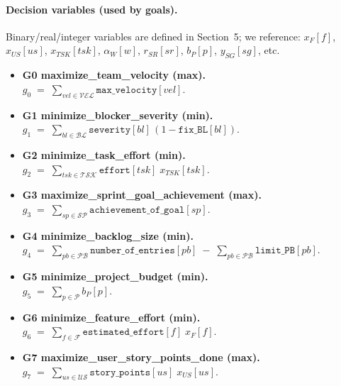 \documentclass[11pt,a4paper]{article}
\begin{document}
\paragraph{Decision variables (used by goals).}
Binary/real/integer variables are defined in Section~5; we reference:
$x_F[f]$, $x_{US}[us]$, $x_{TSK}[tsk]$, $\alpha_W[w]$, $r_{SR}[sr]$, $b_P[p]$, $y_{SG}[sg]$, etc.

\begin{itemize}[leftmargin=2em]
  \item \textbf{G0 \; maximize\_team\_velocity (max).}\\
  $g_0 \;=\; \displaystyle \sum_{vel \in \mathcal{VEL}} \texttt{max\_velocity}[vel]$.

  \item \textbf{G1 \; minimize\_blocker\_severity (min).}\\
  $g_1 \;=\; \displaystyle \sum_{bl \in \mathcal{BL}} \texttt{severity}[bl]\,(1 - \texttt{fix\_BL}[bl])$.

  \item \textbf{G2 \; minimize\_task\_effort (min).}\\
  $g_2 \;=\; \displaystyle \sum_{tsk \in \mathcal{TSK}} \texttt{effort}[tsk]\; x_{TSK}[tsk]$.

  \item \textbf{G3 \; maximize\_sprint\_goal\_achievement (max).}\\
  $g_3 \;=\; \displaystyle \sum_{sp \in \mathcal{SP}} \texttt{achievement\_of\_goal}[sp]$.

  \item \textbf{G4 \; minimize\_backlog\_size (min).}\\
  $g_4 \;=\; \displaystyle \sum_{pb \in \mathcal{PB}} \texttt{number\_of\_entries}[pb] \;-\; \sum_{pb \in \mathcal{PB}} \texttt{limit\_PB}[pb]$.

  \item \textbf{G5 \; minimize\_project\_budget (min).}\\
  $g_5 \;=\; \displaystyle \sum_{p \in \mathcal{P}} b_P[p]$.

  \item \textbf{G6 \; minimize\_feature\_effort (min).}\\
  $g_6 \;=\; \displaystyle \sum_{f \in \mathcal{F}} \texttt{estimated\_effort}[f]\; x_F[f]$.

  \item \textbf{G7 \; maximize\_user\_story\_points\_done (max).}\\
  $g_7 \;=\; \displaystyle \sum_{us \in \mathcal{US}} \texttt{story\_points}[us]\; x_{US}[us]$.


\end{itemize}
\end{document}
